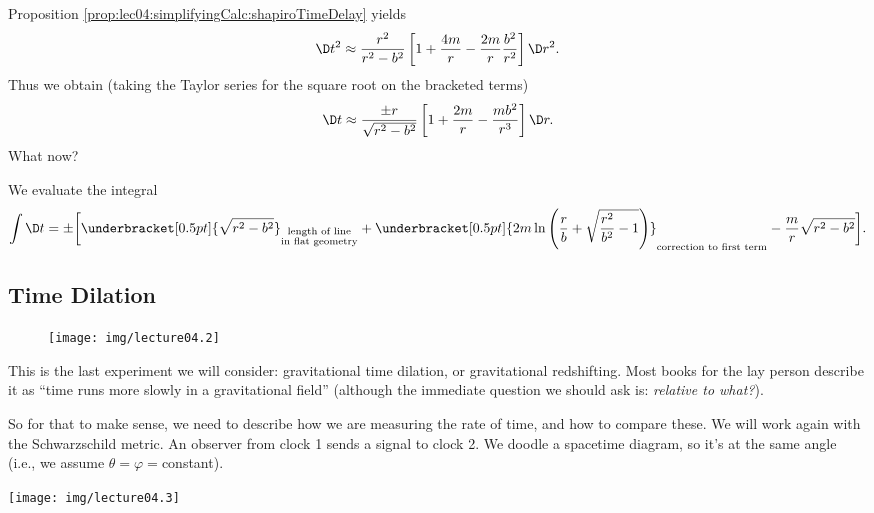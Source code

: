 Proposition \eqref{prop:lec04:simplifyingCalc:shapiroTimeDelay} yields
\begin{equation}
\D t^{2}\approx\frac{r^{2}}{r^{2}-b^{2}}\left[1
+\frac{4m}{r}-\frac{2m}{r}\frac{b^{2}}{r^{2}}\right]\D r^{2}.
\end{equation}
Thus we obtain (taking the Taylor series for the square root on
the bracketed terms)
\begin{equation}
\D t\approx
\frac{\pm r}{\sqrt{r^{2}-b^{2}}}\left[
1+\frac{2m}{r}-\frac{mb^{2}}{r^{3}}
\right]\D r.
\end{equation}
What now?

We evaluate the integral
\begin{equation}
\int\D t=\pm\biggl[
\underbracket[0.5pt]{\sqrt{r^{2}-b^{2}}}_{\substack{\text{length of line}\\\text{in flat geometry}}}
+\underbracket[0.5pt]{2m\ln\left(\frac{r}{b}+\sqrt{\frac{r^{2}}{b^{2}}-1}\right)}_{\text{correction to first term}}
-\frac{m}{r}\sqrt{r^{2}-b^{2}}
\biggr].
\end{equation}

\subsection{Time Dilation}

\begin{wrapfigure}{r}{4pc}
  \vspace{-1pc}
  \texttt{[image: img/lecture04.2]}
\end{wrapfigure}

This is the last experiment we will consider: gravitational time
dilation, or gravitational redshifting. Most books for the lay
person describe it as ``time runs more slowly in a gravitational
field'' (although the immediate question we should ask is:
\emph{relative to what?}).

So for that to make sense, we need to describe how we are
measuring the rate of time, and how to compare these. We will
work again with the Schwarzschild metric. An observer from clock
1 sends a signal to clock 2. We doodle a spacetime diagram, so
it's at the same angle (i.e., we assume $\theta=\varphi=$constant). 

\begin{center}
  \texttt{[image: img/lecture04.3]}
\end{center}

